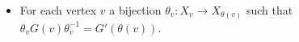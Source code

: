 \documentclass[preview]{standalone}
\begin{document}
\begin{center}
\begin{itemize} \item For each vertex $v$ a bijection $\theta_v : X_v \to X_{\theta(v)}$ such that $\theta_v G(v)\theta_v^{-1} = G'(\theta(v))$.\end{itemize}
\end{center}
\end{document}
